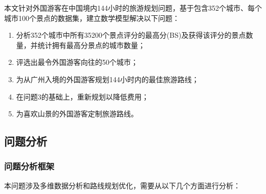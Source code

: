 \documentclass[withoutpreface,bwprint]{cumcmthesis} %
\begin{document}
本文针对外国游客在中国境内144小时的旅游规划问题，基于包含352个城市、每个城市100个景点的数据集，建立数学模型解决以下问题：
\begin{enumerate}
    \item 分析352个城市中所有35200个景点评分的最高分(BS)及获得该评分的景点数量，并统计拥有最高分景点的城市数量；
    \item 评选出最令外国游客向往的50个城市；
    \item 为从广州入境的外国游客规划144小时内的最佳旅游路线；
    \item 在问题3的基础上，重新规划以降低费用；
    \item 为喜欢山景的外国游客定制旅游路线。
\end{enumerate}

\subsection{问题分析}

\subsubsection{问题分析框架}

本问题涉及多维数据分析和路线规划优化，需要从以下几个方面进行分析：
\end{document}
